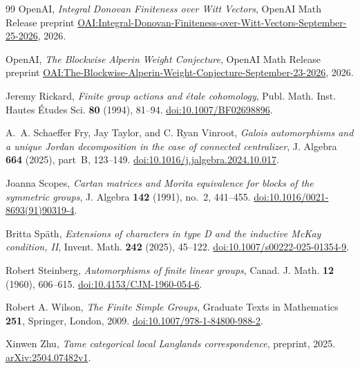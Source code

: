 \begin{thebibliography}{99}
OpenAI,
\emph{Integral Donovan Finiteness over Witt Vectors},
OpenAI Math Release preprint
\href{https://github.com/openai/math/blob/main/preprints/Integral-Donovan-Finiteness-over-Witt-Vectors-September-25-2026/main.pdf}{OAI:Integral-Donovan-Finiteness-over-Witt-Vectors-September-25-2026},
2026.

OpenAI,
\emph{The Blockwise Alperin Weight Conjecture},
OpenAI Math Release preprint
\href{https://github.com/openai/math/blob/main/preprints/The-Blockwise-Alperin-Weight-Conjecture-September-23-2026/paper.pdf}{OAI:The-Blockwise-Alperin-Weight-Conjecture-September-23-2026},
2026.

Jeremy Rickard,
\emph{Finite group actions and \'etale cohomology},
Publ. Math. Inst. Hautes \'Etudes Sci. \textbf{80} (1994), 81--94.
\href{https://doi.org/10.1007/BF02698896}{doi:10.1007/BF02698896}.

A.~A. Schaeffer Fry, Jay Taylor, and C. Ryan Vinroot,
\emph{Galois automorphisms and a unique Jordan decomposition
in the case of connected centralizer},
J. Algebra \textbf{664} (2025), part~B, 123--149.
\href{https://doi.org/10.1016/j.jalgebra.2024.10.017}{doi:10.1016/j.jalgebra.2024.10.017}.

Joanna Scopes,
\emph{Cartan matrices and Morita equivalence for blocks of the symmetric groups},
J. Algebra \textbf{142} (1991), no.~2, 441--455.
\href{https://doi.org/10.1016/0021-8693(91)90319-4}{doi:10.1016/0021-8693(91)90319-4}.

Britta Sp\"ath,
\emph{Extensions of characters in type D and the inductive McKay condition, II},
Invent. Math. \textbf{242} (2025), 45--122.
\href{https://doi.org/10.1007/s00222-025-01354-9}{doi:10.1007/s00222-025-01354-9}.

Robert Steinberg,
\emph{Automorphisms of finite linear groups},
Canad. J. Math. \textbf{12} (1960), 606--615.
\href{https://doi.org/10.4153/CJM-1960-054-6}{doi:10.4153/CJM-1960-054-6}.

Robert A. Wilson,
\emph{The Finite Simple Groups},
Graduate Texts in Mathematics \textbf{251}, Springer, London, 2009.
\href{https://doi.org/10.1007/978-1-84800-988-2}{doi:10.1007/978-1-84800-988-2}.

Xinwen Zhu,
\emph{Tame categorical local Langlands correspondence},
preprint, 2025.
\href{https://arxiv.org/abs/2504.07482v1}{arXiv:2504.07482v1}.

\end{thebibliography}

